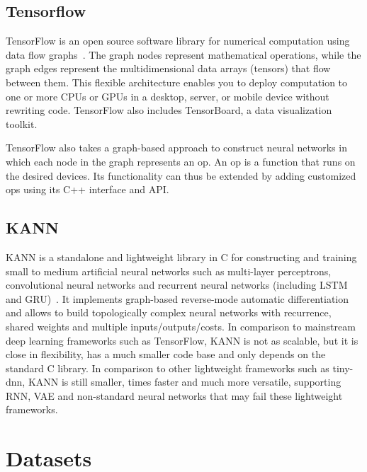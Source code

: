 \subsection{Tensorflow}
TensorFlow is an open source software library for numerical computation using 
data flow graphs~\cite{tensorflow}. The graph nodes represent mathematical 
operations, while the graph edges represent the multidimensional data arrays 
(tensors) that flow between them.  This flexible architecture enables you to 
deploy computation to one or more CPUs or GPUs in a desktop, server, or mobile 
device without rewriting code. TensorFlow also includes TensorBoard, a data 
visualization toolkit.

TensorFlow also takes a graph-based approach to construct neural networks in 
which each node in the graph represents an op. An op is a function that runs on 
the desired devices. Its functionality can thus be extended by adding customized 
ops using its C++ interface and API.

\subsection{KANN}
\label{sec:kann}
KANN is a standalone and lightweight library in C for constructing and training 
small to medium artificial neural networks such as multi-layer perceptrons, 
convolutional neural networks and recurrent neural networks (including LSTM and 
GRU)~\cite{kann}. It implements graph-based reverse-mode automatic 
differentiation and allows to build topologically complex neural networks with 
recurrence, shared weights and multiple inputs/outputs/costs. In comparison to 
mainstream deep learning frameworks such as TensorFlow, KANN is not as scalable, 
but it is close in flexibility, has a much smaller code base and only depends on 
the standard C library. In comparison to other lightweight frameworks such as 
tiny-dnn, KANN is still smaller, times faster and much more versatile, 
supporting RNN, VAE and non-standard neural networks that may fail these 
lightweight frameworks.

\section{Datasets}
